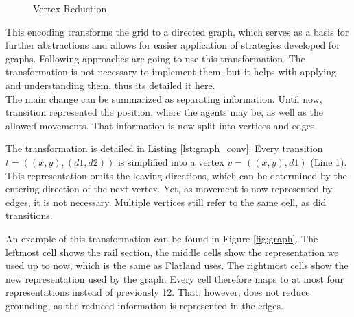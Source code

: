 \documentclass{llncs}
\begin{document}
\begin{multicols*}{2}
\begin{figure}[t]
\begin{minipage}[t]{0.54\textwidth}

    \caption{Vertex Reduction}
    \label{fig:reduction}
\end{minipage}
\end{figure}
\begin{figure}[b]
    
\end{figure}

This encoding transforms the grid to a directed graph, which serves as a basis for further abstractions and allows for easier application of strategies developed for graphs. Following approaches are going to use this transformation. The transformation is not necessary to implement them, but it helps with applying and understanding them, thus its detailed it here.\\

The main change can be summarized as separating information. Until now, transition represented the position, where the agents may be, as well as the allowed movements. That information is now split into vertices and edges.

The transformation is detailed in Listing \ref{lst:graph_conv}. Every transition $t = ((x,y),(\mathit{d1},\mathit{d2}))$ is simplified into a vertex $v = ((x,y),\mathit{d1})$ (Line 1). This representation omits the leaving directions, which can be determined by the entering direction of the next vertex. Yet, as movement is now represented by edges, it is not necessary. Multiple vertices still refer to the same cell, as did transitions.

An example of this transformation can be found in Figure \ref{fig:graph}. The leftmost cell shows the rail section, the middle cells show the representation we used up to now, which is the same as Flatland uses. The rightmost cells show the new representation used by the graph. Every cell therefore maps to at most four representations instead of previously 12. That, however, does not reduce grounding, as the reduced information is represented in the edges.


\end{multicols*}
\end{document}
